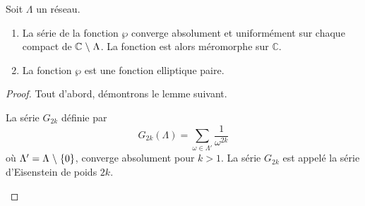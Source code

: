\documentclass[a4paper]{article}
\begin{document}
\begin{theorem} \label{theo3}
Soit $\Lambda$ un réseau.
\begin{enumerate}
\item La série de la fonction $\wp$  converge absolument et uniformément sur chaque compact de $\mathbb{C} \hspace{0.1cm} \backslash \hspace{0.1cm} \Lambda$. 
La fonction est alors méromorphe sur $\mathbb{C}$.
\item La fonction $\wp$  est une fonction elliptique paire.
\end{enumerate}
\end{theorem}
\begin{proof}
Tout d'abord, démontrons le lemme suivant.

\begin{lem}\label{eisen}
La série $G_{2k}$ définie par 
\begin{equation*}
G_{2k}(\Lambda)=\sum \limits_{\omega \in \Lambda'} \frac{1}{\omega^{2k}}
\end{equation*}
où $\Lambda'=\Lambda \hspace{0.1cm} \backslash \hspace{0.1cm} \{0\}$, converge absolument pour $k>1$. La série $G_{2k}$ est appelé la série d'Eisenstein de poids $2k$.
\end{lem}



\end{proof}
\end{document}
